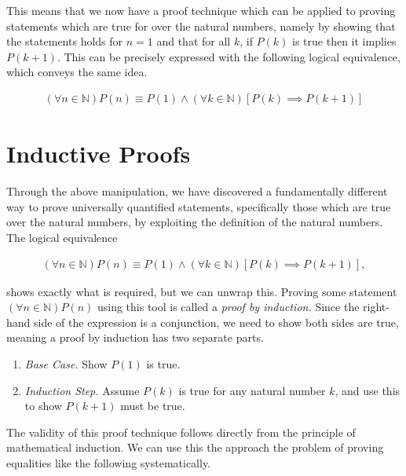 This means that we now have a proof technique which can be applied to proving statements which are true for over the natural numbers, namely by showing that the statements holds for $n = 1$ and that for all $k$, if $P(k)$ is true then it implies $P(k + 1)$. This can be precisely expressed with the following logical equivalence, which conveys the same idea.

\begin{align*}
	(\forall n \in \mathbb{N})P(n) \equiv P(1) \land (\forall k \in \mathbb{N})[P(k) \implies P(k + 1)]
\end{align*}

\section{Inductive Proofs}

Through the above manipulation, we have discovered a fundamentally different way to prove universally quantified statements, specifically those which are true over the natural numbers, by exploiting the definition of the natural numbers. The logical equivalence

\begin{align*}
	(\forall n \in \mathbb{N})P(n) \equiv P(1) \land (\forall k \in \mathbb{N})[P(k) \implies P(k + 1)],
\end{align*}

shows exactly what is required, but we can unwrap this. Proving some statement $(\forall n \in \mathbb{N})P(n)$ using this tool is called a \emph{proof by induction.} Since the right-hand side of the expression is a conjunction, we need to show both sides are true, meaning a proof by induction has two separate parts.

\vspace{\baselineskip}
\begin{enumerate}
	\item \emph{Base Case.} Show $P(1)$ is true.
	\item \emph{Induction Step.} Assume $P(k)$ is true for any natural number $k$, and use this to show $P(k + 1)$ must be true.
\end{enumerate}
\vspace{\baselineskip}

The validity of this proof technique follows directly from the principle of mathematical induction. We can use this the approach the problem of proving equalities like the following systematically.

